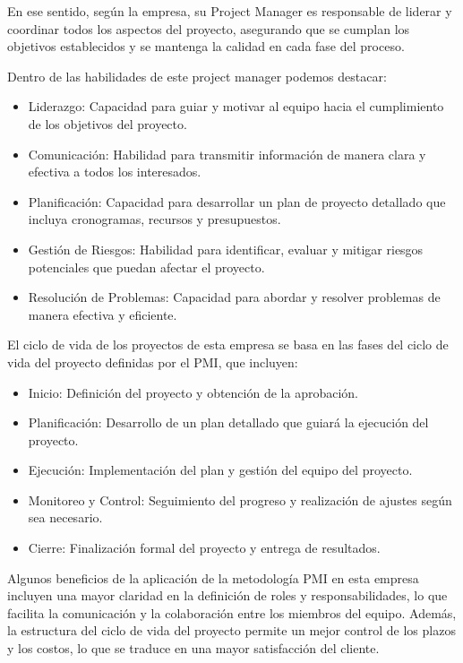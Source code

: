\documentclass[12pt,a4paper]{article}
\begin{document}
En ese sentido, según la empresa, su Project Manager es responsable de liderar y coordinar todos los aspectos del proyecto, asegurando que se cumplan los objetivos establecidos y se mantenga la calidad en cada fase del proceso.

Dentro de las habilidades de este project manager podemos destacar:

\begin{itemize}
    \item Liderazgo: Capacidad para guiar y motivar al equipo hacia el cumplimiento de los objetivos del proyecto.
    \item Comunicación: Habilidad para transmitir información de manera clara y efectiva a todos los interesados.
    \item Planificación: Capacidad para desarrollar un plan de proyecto detallado que incluya cronogramas, recursos y presupuestos.
    \item Gestión de Riesgos: Habilidad para identificar, evaluar y mitigar riesgos potenciales que puedan afectar el proyecto.
    \item Resolución de Problemas: Capacidad para abordar y resolver problemas de manera efectiva y eficiente.
\end{itemize}

El ciclo de vida de los proyectos de esta empresa se basa en las fases del ciclo de vida del proyecto definidas por el PMI, que incluyen:

\begin{itemize}
    \item Inicio: Definición del proyecto y obtención de la aprobación.
    \item Planificación: Desarrollo de un plan detallado que guiará la ejecución del proyecto.
    \item Ejecución: Implementación del plan y gestión del equipo del proyecto.
    \item Monitoreo y Control: Seguimiento del progreso y realización de ajustes según sea necesario.
    \item Cierre: Finalización formal del proyecto y entrega de resultados.
\end{itemize}

Algunos beneficios de la aplicación de la metodología PMI en esta empresa incluyen una mayor claridad en la definición de roles y responsabilidades, lo que facilita la comunicación y la colaboración entre los miembros del equipo. Además, la estructura del ciclo de vida del proyecto permite un mejor control de los plazos y los costos, lo que se traduce en una mayor satisfacción del cliente.
\end{document}
